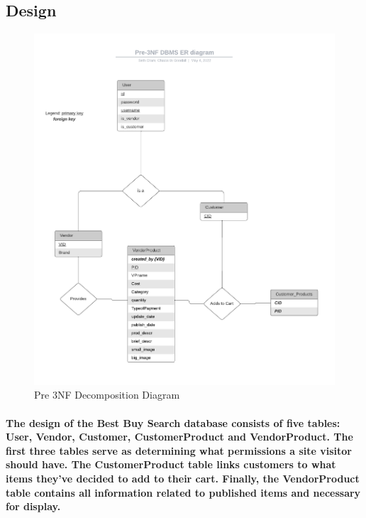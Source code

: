 \documentclass[sigconf]{acmart}
\begin{document}
\subsection{Design}

\begin{figure}[H]
    \centering
    \includegraphics[scale=0.4]{Pre_Post-3NF DBMS ER diagram (UML notation) (2).png}
    \caption{Pre 3NF Decomposition Diagram}
    \label{fig:my_label}
\end{figure}


\paragraph{ The design of the Best Buy Search database consists of five tables: User, Vendor, Customer, CustomerProduct and VendorProduct. The first three tables serve as determining what permissions a site visitor should have. The CustomerProduct table links customers to what items they've decided to add to their cart. Finally, the VendorProduct table contains all information related to published items and necessary for display. }
\end{document}
